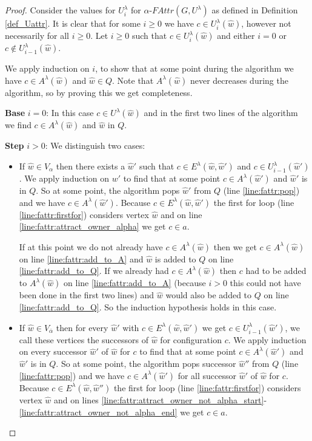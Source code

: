 \begin{theorem}
\begin{proof}
		Consider the values for $U^\lambda_i$ for $\alpha\textit{-FAttr}(G,U^\lambda)$ as defined in Definition \ref{def_Uattr}. It is clear that for some $i \geq 0$ we have $c \in U^\lambda_i(\hat{w})$, however not necessarily for all $i \geq 0$.	Let $i \geq 0$ such that $c \in U^\lambda_i(\hat{w})$ and either $i=0$ or $c \notin U^\lambda_{i-1}(\hat{w})$.
		
		We apply induction on $i$, to show that at some point during the algorithm we have $c \in A^\lambda(\hat{w})$ and $\hat{w} \in Q$. Note that $A^\lambda(\hat{w})$ never decreases during the algorithm, so by proving this we get completeness.
		
		\textbf{Base} $i=0$: In this case $c \in U^\lambda(\hat{w})$ and in the first two lines of the algorithm we find $c \in A^\lambda(\hat{w})$ and $\hat{w}$ in $Q$.
		
		\textbf{Step} $i > 0$: We distinguish two cases:
		\begin{itemize}
			\item If $\hat{w} \in \hat{V}_\alpha$ then there exists a $\hat{w}'$ such that $c \in E^\lambda(\hat{w},\hat{w}')$ and $c \in U^\lambda_{i-1}(\hat{w}')$. We apply induction on $w'$ to find that at some point $c \in A^\lambda(\hat{w}')$ and $\hat{w}'$ is in $Q$. So at some point, the algorithm pops $\hat{w}'$ from $Q$ (line \ref{line:fattr:pop}) and we have $c \in A^\lambda(\hat{w}')$. Because $c \in E^\lambda(\hat{w},\hat{w}')$ the first for loop (line \ref{line:fattr:firstfor}) considers vertex $\hat{w}$ and on line \ref{line:fattr:attract_owner_alpha} we get $c \in a$. 
		
			If at this point we do not already have $c \in A^\lambda(\hat{w})$ then we get $c \in A^\lambda(\hat{w})$ on line \ref{line:fattr:add_to_A} and $\hat{w}$ is added to $Q$ on line \ref{line:fattr:add_to_Q}. If we already had $c \in A^\lambda(\hat{w})$ then $c$ had to be added to $A^\lambda(\hat{w})$ on line \ref{line:fattr:add_to_A} (because $i > 0$ this could not have been done in the first two lines) and $\hat{w}$ would also be added to $Q$ on line \ref{line:fattr:add_to_Q}. So the induction hypothesis holds in this case.
			
			\item If $\hat{w} \in \hat{V}_{\overline{\alpha}}$ then for every $\hat{w}'$ with $c \in E^\lambda(\hat{w},\hat{w}')$ we get $c \in U^\lambda_{i-1}(\hat{w}')$, we call these vertices the successors of $\hat{w}$ for configuration $c$. We apply induction on every successor $\hat{w}'$ of $\hat{w}$ for $c$ to find that at some point $c \in A^\lambda(\hat{w}')$ and $\hat{w}'$ is in $Q$. So at some point, the algorithm pops successor $\hat{w}''$ from $Q$ (line \ref{line:fattr:pop}) and we have $c \in A^\lambda(\hat{w}')$ for all successor $\hat{w}'$ of $\hat{w}$ for $c$. Because $c \in E^\lambda(\hat{w},\hat{w}'')$ the first for loop (line \ref{line:fattr:firstfor}) considers vertex $\hat{w}$ and on lines \ref{line:fattr:attract_owner_not_alpha_start}-\ref{line:fattr:attract_owner_not_alpha_end} we get $c \in a$. 
			

\end{itemize}
\end{proof}
\end{theorem}
